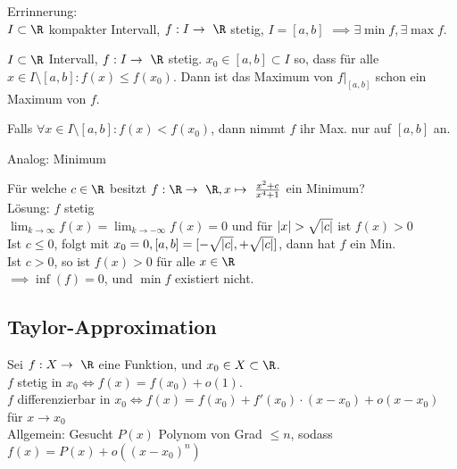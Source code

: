 Errinnerung: \\
$I \subset \R$ kompakter Intervall, $f: I \rightarrow \R$ stetig, $I = [a,b]$ $\implies \exists \min f , \exists \max f$.\\
\begin{satz*}
	$I \subset \R$ Intervall, $f: I \rightarrow \R$ stetig. $x_0 \in [a,b] \subset I$ so, dass für alle $x \in I \setminus [a,b] : f(x) \leq f(x_0)$. Dann ist das Maximum von $f|_{[a,b]}$ schon ein Maximum von $f$.\\
	\begin{bem}
		Falls $\forall x \in I \setminus [a,b] : f(x) < f(x_0)$, dann nimmt $f$ ihr Max. nur auf $[a,b]$ an.
	\end{bem}
	Analog: Minimum
\end{satz*}
\begin{bsp}
	Für welche $c \in \R$ besitzt $f: \R \rightarrow \R , x \mapsto \frac{x^2 + c}{x^4 + 1}$ ein Minimum? \\
	Lösung: $f$ stetig \\
	$\lim_{k \rightarrow \infty} f(x) = \lim_{k \rightarrow -\infty} f(x) = 0$ und für $\abs{x} > \sqrt{\abs{c}}$ ist $f(x) > 0$ \\
	Ist $c \leq 0$, folgt mit $x_0 = 0 , [a,b] = [-\sqrt{\abs{c}},+\sqrt{\abs{c}}]$, dann hat $f$ ein Min. \\
	Ist $c > 0$, so ist $f(x) > 0$ für alle $x \in \R$ \\
	$\implies \inf(f) = 0$, und $\min f$ existiert nicht.
\end{bsp}

\subsection{Taylor-Approximation}
Sei $f: X \rightarrow \R$ eine Funktion, und $x_0 \in X \subset \R$. \\
$f$ stetig in $x_0 \iff f(x) = f(x_0) + o(1)$. \\
$f$ differenzierbar in $x_0 \iff f(x) = f(x_0) + f'(x_0) \cdot (x - x_0) + o(x-x_0)$ für $x \rightarrow x_0$\\
Allgemein: Gesucht $P(x)$ Polynom von Grad $\leq n$, sodass $f(x) = P(x) + o((x-x_0)^n)$

